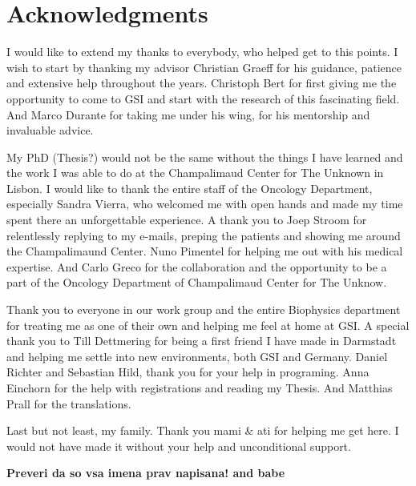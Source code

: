 

\chapter*{Acknowledgments}

I would like to extend my thanks to everybody, who helped get to this points.
I wish to start by thanking my advisor Christian Graeff for his guidance, patience and extensive help throughout the years. 
Christoph Bert for first giving me the opportunity to come to GSI and start with the research of this fascinating field. And Marco Durante for taking me under his wing, for his mentorship and invaluable advice.  

My PhD (Thesis?) would not be the same without the things I have learned and the work I was able to do at the Champalimaud Center for The Unknown in Lisbon. I would like to thank the entire staff of the Oncology Department, especially Sandra Vierra, who welcomed me with open hands and made my time spent there an unforgettable experience. A thank you to Joep Stroom for relentlessly replying to my e-mails, preping the patients and showing me around the Champalimaund Center. Nuno Pimentel for helping me out with his medical expertise. And Carlo Greco for the collaboration and the opportunity to be a part of the  Oncology Department of Champalimaud Center for The Unknow.

Thank you to everyone in our work group and the entire Biophysics department for treating me as one of their own and helping me feel at home at GSI. A special thank you to Till Dettmering for being a first friend I have made in Darmstadt and helping me settle into new environments, both GSI and Germany.  Daniel Richter and Sebastian Hild, thank you for your help in programing. Anna Einchorn for the help with registrations and reading my Thesis. And Matthias Prall for the translations. 

Last but not least, my family. Thank you mami & ati for helping me get here. I would not have made it without your help and unconditional support. 

\textbf{Preveri da so vsa imena prav napisana! and babe}

